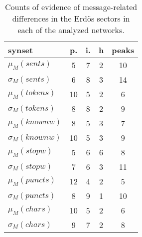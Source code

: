 \begin{table}[h!]
\begin{center}
\begin{tabular}{| l || c | c | c || c |}\hline
{\bf synset} & {\bf p.} & {\bf i.} & {\bf h} & {\bf peaks} \\\hline\hline
$\mu_M(sents)$ & 5  & 7  & 2  & 10 \\
$\sigma_M(sents)$ & 6  & 8  & 3  & 14 \\\hline
$\mu_M(tokens)$ & 10  & 5  & 2  & 6 \\
$\sigma_M(tokens)$ & 8  & 8  & 2  & 9 \\\hline
$\mu_M(knownw)$ & 8  & 5  & 3  & 7 \\
$\sigma_M(knownw)$ & 10  & 5  & 3  & 9 \\\hline
$\mu_M(stopw)$ & 5  & 6  & 6  & 8 \\
$\sigma_M(stopw)$ & 7  & 6  & 3  & 11 \\\hline
$\mu_M(puncts)$ & 12  & 4  & 2  & 5 \\
$\sigma_M(puncts)$ & 8  & 9  & 1  & 10 \\\hline
$\mu_M(chars)$ & 10  & 5  & 2  & 6 \\
$\sigma_M(chars)$ & 9  & 7  & 2  & 8 \\\hline
\end{tabular}
\caption{Counts of evidence of message-related differences in the Erd\"os sectors in each of the analyzed networks.}
\end{center}
\end{table}